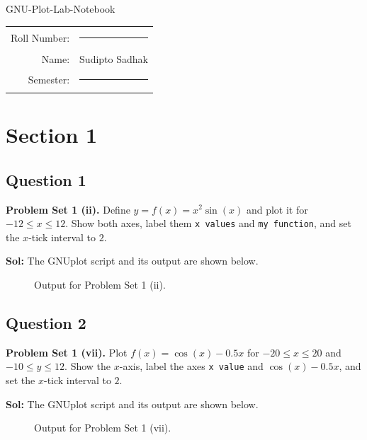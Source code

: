 \documentclass{book}
\begin{document}
\begin{titlepage}
    \centering
    \vspace*{2cm}
    {\LARGE GNU-Plot-Lab-Notebook\par}
    \vspace{3cm}
    \begin{tabular}{rl}
        Roll Number: & \rule{8cm}{0.4pt}\\[1.5cm]
        Name: & Sudipto Sadhak\\[1.5cm]
        Semester: & \rule{8cm}{0.4pt}
    \end{tabular}
\end{titlepage}

\newpage
\section*{Section 1}

\subsection*{Question 1}
\noindent\textbf{Problem Set 1 (ii).} Define $y=f(x)=x^2\sin(x)$ and plot it for $-12\le x\le12$. Show both axes, label them \texttt{x values} and \texttt{my function}, and set the $x$-tick interval to $2$.

\noindent\textbf{Sol:} The GNUplot script and its output are shown below.

\begin{figure}[H]
    \centering
    
    \caption{Output for Problem Set 1 (ii).}
\end{figure}
\newpage

\subsection*{Question 2}
\noindent\textbf{Problem Set 1 (vii).} Plot $f(x)=\cos(x)-0.5x$ for $-20\le x\le20$ and $-10\le y\le12$. Show the $x$-axis, label the axes \texttt{x value} and $\cos(x)-0.5x$, and set the $x$-tick interval to $2$.

\noindent\textbf{Sol:} The GNUplot script and its output are shown below.

\begin{figure}[H]
    \centering
    
    \caption{Output for Problem Set 1 (vii).}
\end{figure}
\newpage
\end{document}
